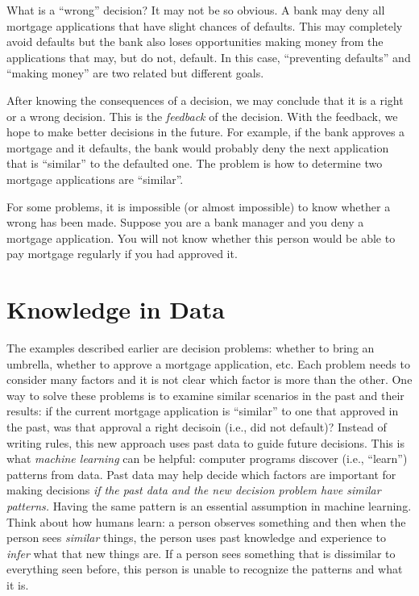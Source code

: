 What is a ``wrong'' decision? It may not be so obvious.  A bank may
deny all mortgage applications that have slight chances of
defaults. This may completely avoid defaults but the bank also loses
opportunities making money from the applications that may, but do not,
default.  In this case, ``preventing defaults'' and ``making money''
are two related but different goals.

After knowing the consequences of a decision, we may conclude that it
is a right or a wrong decision. This is the {\it feedback} of the
decision.  With the feedback, we hope to make better decisions in the
future. For example, if the bank approves a mortgage and it defaults,
the bank would probably deny the next application that is ``similar''
to the defaulted one.  The problem is how to determine two mortgage
applications are ``similar''.

For some problems, it is impossible (or almost impossible) to know
whether a wrong has been made. Suppose you are a bank manager and you
deny a mortgage application. You will not know whether this person
would be able to pay mortgage regularly if you had approved it.



\section{Knowledge in Data}


The examples described earlier are decision problems: whether to bring
an umbrella, whether to approve a mortgage application, etc. Each
problem needs to consider many factors and it is not clear which
factor is more than the other. One way to solve these problems is to
examine similar scenarios in the past and their results: if the
current mortgage application is ``similar'' to one that approved in
the past, was that approval a right decisoin (i.e., did not default)?
Instead of writing rules, this new approach uses past data to guide
future decisions.  This is what {\it machine learning} can be helpful:
computer programs discover (i.e., ``learn'') patterns from data.  Past
data may help decide which factors are important for making decisions
{\it if the past data and the new decision problem have similar
  patterns.}  Having the same pattern is an essential assumption in
machine learning.  Think about how humans learn: a person observes
something and then when the person sees {\it similar} things, the
person uses past knowledge and experience to {\it infer} what that new
things are.  If a person sees something that is dissimilar to
everything seen before, this person is unable to recognize the
patterns and what it is.

